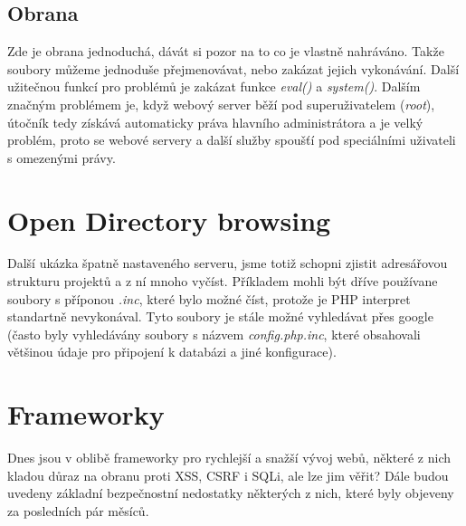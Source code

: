 \documentclass[12pt, a4paper]{report}
\begin{document}
\subsection{Obrana}
Zde je obrana jednoduchá, dávát si pozor na to co je vlastně nahráváno. Takže soubory můžeme jednoduše přejmenovávat, nebo zakázat jejich vykonávání. Další užitečnou funkcí pro  problémů je zakázat funkce \textit{eval()} a \textit{system()}. Dalším značným problémem je, když webový server běží pod superuživatelem (\textit{root}), útočník tedy získává automaticky práva hlavního administrátora a je velký problém, proto se webové servery a další služby spoušťí pod speciálními uživateli s omezenými právy.

\section{Open Directory browsing}
Další ukázka špatně nastaveného serveru, jsme totiž schopni zjistit adresářovou strukturu projektů a z ní mnoho vyčíst. Příkladem mohli být dříve používane soubory s příponou \textit{.inc}, které bylo možné číst, protože je PHP interpret standartně nevykonával. Tyto soubory je stále možné vyhledávat přes google (často byly vyhledávány soubory s názvem \textit{config.php.inc}, které obsahovali většinou údaje pro připojení k databázi a jiné konfigurace).

\section{Frameworky}
Dnes jsou v oblibě frameworky pro rychlejší a snažší vývoj webů, některé z nich kladou důraz na obranu proti XSS, CSRF i SQLi, ale lze jim věřit? Dále budou uvedeny základní bezpečnostní nedostatky některých z nich, které byly objeveny za posledních pár měsíců.
\end{document}
